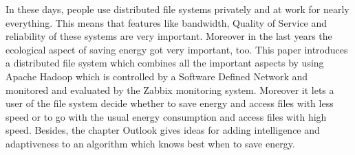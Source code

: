 



In these days, people use distributed file systems privately and at work for nearly everything. This means that features like bandwidth, Quality of Service and reliability of these systems are very important. Moreover in the last years the ecological aspect of saving energy got very important, too. This paper introduces a distributed file system which combines all the important aspects by using Apache Hadoop which is controlled by a Software Defined Network and monitored and evaluated by the Zabbix monitoring system. Moreover it lets a user of the file system decide whether to save energy and access files with less speed or to go with the usual energy consumption and access files with high speed. Besides, the chapter Outlook gives ideas for adding intelligence and adaptiveness to an algorithm which knows best when to save energy.